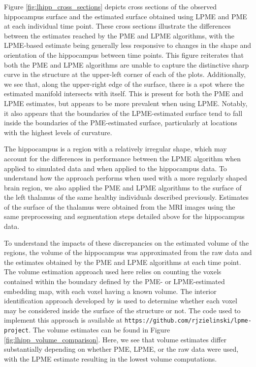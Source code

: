 \documentclass[11pt,reqno]{article}
\theoremstyle{definition}
\begin{document}
Figure \ref{fig:lhipp_cross_sections} depicts cross sections of the observed hippocampus surface and the estimated surface obtained using LPME and PME at each individual time point. These cross sections illustrate the differences between the estimates reached by the PME and LPME algorithms, with the LPME-based estimate being generally less responsive to changes in the shape and orientation of the hippocampus between time points. This figure reiterates that both the PME and LPME algorithms are unable to capture the distinctive sharp curve in the structure at the upper-left corner of each of the plots. Additionally, we see that, along the upper-right edge of the surface, there is a spot where the estimated manifold intersects with itself. This is present for both the PME and LPME estimates, but appears to be more prevalent when using LPME. Notably, it also appears that the boundaries of the LPME-estimated surface tend to fall inside the boundaries of the PME-estimated surface, particularly at locations with the highest levels of curvature.

The hippocampus is a region with a relatively irregular shape, which may account for the differences in performance between the LPME algorithm when applied to simulated data and when applied to the hippocampus data. To understand how the approach performs when used with a more regularly shaped brain region, we also applied the PME and LPME algorithms to the surface of the left thalamus of the same healthy individuals described previously. Estimates of the surface of the thalamus were obtained from the MRI images using the same preprocessing and segmentation steps detailed above for the hippocampus data.

To understand the impacts of these discrepancies on the estimated volume of the regions, the volume of the hippocampus was approximated from the raw data and the estimates obtained by the PME and LPME algorithms at each time point. The volume estimation approach used here relies on counting the voxels contained within the boundary defined by the PME- or LPME-estimated embedding map, with each voxel having a known volume. The interior identification approach developed by \cite{mengPrincipalManifoldEstimation2021} is used to determine whether each voxel may be considered inside the surface of the structure or not. The code used to implement this approach is available at \texttt{https://github.com/rjzielinski/lpme-project}. The volume estimates can be found in Figure \ref{fig:lhipp_volume_comparison}. Here, we see that volume estimates differ substantially depending on whether PME, LPME, or the raw data were used, with the LPME estimate resulting in the lowest volume computations.
\end{document}

